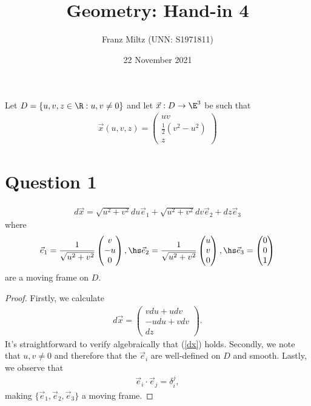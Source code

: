 \documentclass{article}
\begin{document}
\title{Geometry: Hand-in 4}
\author{Franz Miltz (UNN: S1971811)}
\date{22 November 2021}
\maketitle
\noindent Let $D=\{u,v,z\in\R : u,v\not=0\}$ and let $\vec x:D\to\E^3$ be such that
\begin{align*}
   \vec x(u,v,z) = \begin{pmatrix}
      uv \\ \frac{1}{2}(v^2 - u^2) \\ z
   \end{pmatrix}
\end{align*}

\section*{Question 1}

\begin{claim*}
   \begin{align}
      \label{dx}
      d\vec x = \sqrt{u^2 + v^2}du\vec e_1
      + \sqrt{u^2 + v^2}dv \vec e_2
      + dz\vec e_3
   \end{align}
   where
   \begin{align*}
      \vec e_1 = \frac{1}{\sqrt{u^2 + v^2}}\begin{pmatrix}
         v \\ -u \\ 0
      \end{pmatrix} , \hs
      \vec e_2 = \frac{1}{\sqrt{u^2 + v^2}}\begin{pmatrix}
         u \\ v \\ 0
      \end{pmatrix}, \hs
      \vec e_3 = \begin{pmatrix}
         0 \\ 0 \\ 1
      \end{pmatrix}
   \end{align*}
   are a moving frame on $D$.
\end{claim*}
\begin{proof}
   Firstly, we calculate
   \begin{align*}
      d\vec x = \begin{pmatrix}
         v du + u dv  \\
         -u du + v dv \\
         dz
      \end{pmatrix}.
   \end{align*}
   It's straightforward to verify algebraically that (\ref{dx}) holds. Secondly,
   we note that $u,v\not=0$ and therefore that the $\vec e_i$ are well-defined on $D$
   and smooth. Lastly, we observe that
   \begin{align}
      \vec e_i \cdot \vec e_j = \delta_i^j,
   \end{align}
   making $\{\vec e_1, \vec e_2, \vec e_3\}$ a moving frame.
\end{proof}
\end{document}
